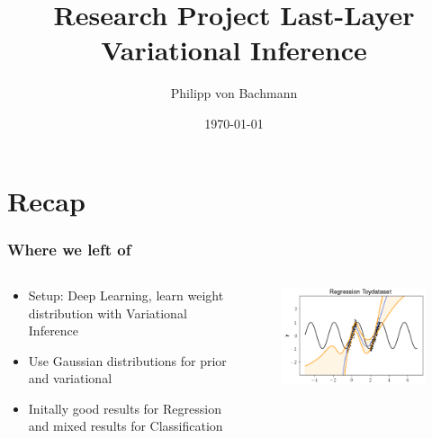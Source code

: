 \documentclass{beamer}
\title{Research Project Last-Layer Variational Inference}
\author{Philipp von Bachmann}
\institute{University of Tübingen}
\date{\today}
\begin{document}
        \begin{frame}
            \titlepage
        \end{frame}
        
        \section{Recap}
        \begin{frame}
            \frametitle{Where we left of}
            \begin{columns}
                \begin{column}{0.5\textwidth}
                    \begin{itemize}
                        \item Setup: Deep Learning, learn weight distribution with Variational Inference
                        \item Use Gaussian distributions for prior and variational
                        \item Initally good results for Regression and mixed results for Classification
                    \end{itemize}
                \end{column}
                \begin{column}{0.5\textwidth}
                    \begin{figure}
                        \includegraphics[width=\textwidth]{images/Regression/Toydataset.png}
                    \end{figure}
                \end{column}
            \end{columns}
        \end{frame}
        
\end{document}
